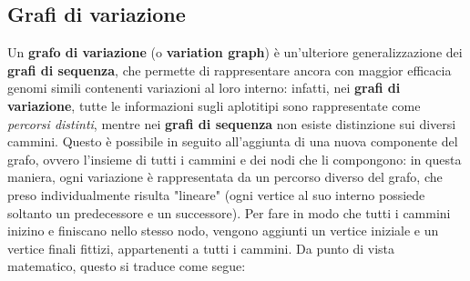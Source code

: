 \subsection{Grafi di variazione}
\label{section:variation_graph}
    Un \textbf{grafo di variazione} (o \textbf{variation graph}) è un'ulteriore generalizzazione dei \textbf{grafi di sequenza}, che permette di rappresentare ancora con maggior efficacia genomi simili contenenti variazioni al loro interno: infatti, nei \textbf{grafi di variazione}, tutte le informazioni sugli aplotitipi sono rappresentate come \emph{percorsi distinti}, mentre nei \textbf{grafi di sequenza} non esiste distinzione sui diversi cammini. Questo è possibile in seguito all'aggiunta di una nuova componente del grafo, ovvero l'insieme di tutti i cammini e dei nodi che li compongono: in questa maniera, ogni variazione è rappresentata da un percorso diverso del grafo, che preso individualmente risulta "lineare" (ogni vertice al suo interno possiede soltanto un predecessore e un successore). Per fare in modo che tutti i cammini inizino e finiscano nello stesso nodo, vengono aggiunti un vertice iniziale e un vertice finali fittizi, appartenenti a tutti i cammini. Da punto di vista matematico, questo si traduce come segue:

